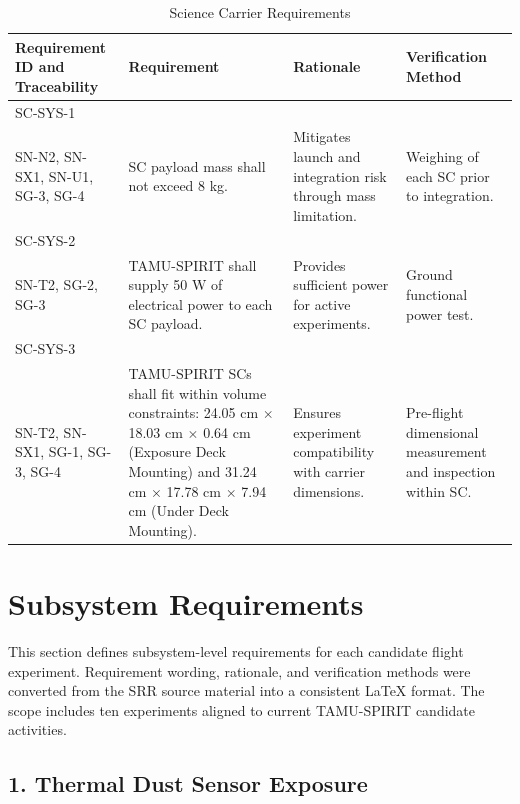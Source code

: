 \documentclass[conf]{new-aiaa}
\begin{document}
\clearpage
\begin{table}[!t]
    \centering
    \footnotesize
    \setlength{\tabcolsep}{4pt}
    \renewcommand{\arraystretch}{1.15}
    \begin{tabularx}{\textwidth}{@{}>{\raggedright\arraybackslash}m{2.2cm}YYY@{}}
    \toprule
    \textbf{Requirement ID and Traceability} & \textbf{Requirement} & \textbf{Rationale} & \textbf{Verification Method} \\
    \midrule
    SC-SYS-1\\SN-N2, SN-SX1, SN-U1, SG-3, SG-4 &
    SC payload mass shall not exceed 8 kg. &
    Mitigates launch and integration risk through mass limitation. &
    Weighing of each SC prior to integration. \\ \hline

    SC-SYS-2\\SN-T2, SG-2, SG-3 &
    TAMU-SPIRIT shall supply 50 W of electrical power to each SC payload. &
    Provides sufficient power for active experiments. &
    Ground functional power test. \\ \hline

    SC-SYS-3\\SN-T2, SN-SX1, SG-1, SG-3, SG-4 &
    TAMU-SPIRIT SCs shall fit within volume constraints: 24.05 cm $\times$ 18.03 cm $\times$ 0.64 cm (Exposure Deck Mounting) and 31.24 cm $\times$ 17.78 cm $\times$ 7.94 cm (Under Deck Mounting). &
    Ensures experiment compatibility with carrier dimensions. &
    Pre-flight dimensional measurement and inspection within SC. \\
    \bottomrule
    \end{tabularx}
    \caption{Science Carrier Requirements}
    \label{tab:sc_requirements}
\end{table}

\clearpage
\section{Subsystem Requirements}

This section defines subsystem-level requirements for each candidate flight experiment. Requirement wording, rationale, and verification methods were converted from the SRR source material into a consistent LaTeX format. The scope includes ten experiments aligned to current TAMU-SPIRIT candidate activities. \cite{tamu-spirit-rfp}

\subsection{1. Thermal Dust Sensor Exposure}
\end{document}
